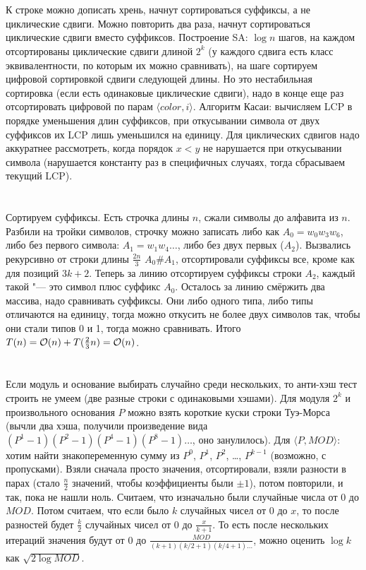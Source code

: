 \section{} %
К строке можно дописать хрень, начнут сортироваться суффиксы, а не циклические сдвиги.
Можно повторить два раза, начнут сортироваться циклические сдвиги вместо суффиксов.
Построение SA: $\log n$ шагов, на каждом отсортированы циклические сдвиги длиной $2^k$ (у каждого сдвига есть класс эквивалентности, по которым их можно сравнивать), на шаге сортируем цифровой сортировкой сдвиги следующей длины.
Но это нестабильная сортировка (если есть одинаковые циклические сдвиги), надо в конце еще раз отсортировать цифровой по парам $\langle color, i \rangle$.
Алгоритм Касаи: вычисляем LCP в порядке уменьшения длин суффиксов, при откусывании символа от двух суффиксов их LCP лишь уменьшился на единицу.
Для циклических сдвигов надо аккуратнее рассмотреть, когда порядок $x<y$ не нарушается при откусывании символа (нарушается константу раз в специфичных случаях, тогда сбрасываем текущий LCP).

\section{} %
Сортируем суффиксы.
Есть строчка длины $n$, сжали символы до алфавита из $n$.
Разбили на тройки символов, строчку можно записать либо как $A_0=w_0w_3w_6$, либо без первого символа: $A_1=w_1w_4\dots$, либо без двух первых ($A_2$).
Вызвались рекурсивно от строки длины $\frac{2n}{3}$ \t{$A_0$\#$A_1$}, отсортировали суффиксы все, кроме как для позиций $3k+2$.
Теперь за линию отсортируем суффиксы строки $A_2$, каждый такой "--- это символ плюс суффикс $A_0$.
Осталось за линию смёржить два массива, надо сравнивать суффиксы.
Они либо одного типа, либо типы отличаются на единицу, тогда можно откусить не более двух символов так, чтобы они стали типов 0 и 1, тогда можно сравнивать.
Итого $T(n) = \mathcal{O}(n) + T(\frac23 n) = \mathcal{O}(n)$.

\section{} %
Если модуль и основание выбирать случайно среди нескольких, то анти-хэш тест строить не умеем (две разные строки с одинаковыми хэшами).
Для модуля $2^k$ и произвольного основания $P$ можно взять короткие куски строки Туэ-Морса (вычли два хэша, получили произведение вида $(P^1-1)(P^2-1)(P^4-1)(P^8-1)\dots$, оно занулилось).
Для $\langle P, MOD \rangle$: хотим найти знакопеременную сумму из $P^0$, $P^1$, $P^2$, \dots, $P^{k-1}$ (возможно, с пропусками).
Взяли сначала просто значения, отсортировали, взяли разности в парах (стало $\frac n 2$ значений, чтобы коэффициенты были $\pm 1$), потом повторили, и так, пока не нашли ноль.
Считаем, что изначально были случайные числа от $0$ до $MOD$.
Потом считаем, что если было $k$ случайных чисел от $0$ до $x$, то после разностей будет $\frac k 2$ случайных чисел от $0$ до $\frac{x}{k+1}$.
То есть после нескольких итераций значения будут от $0$ до $\frac{MOD}{(k+1)(k/2+1)(k/4+1)\dots}$, можно оценить $\log k$ как $\sqrt{2\log MOD}$.


